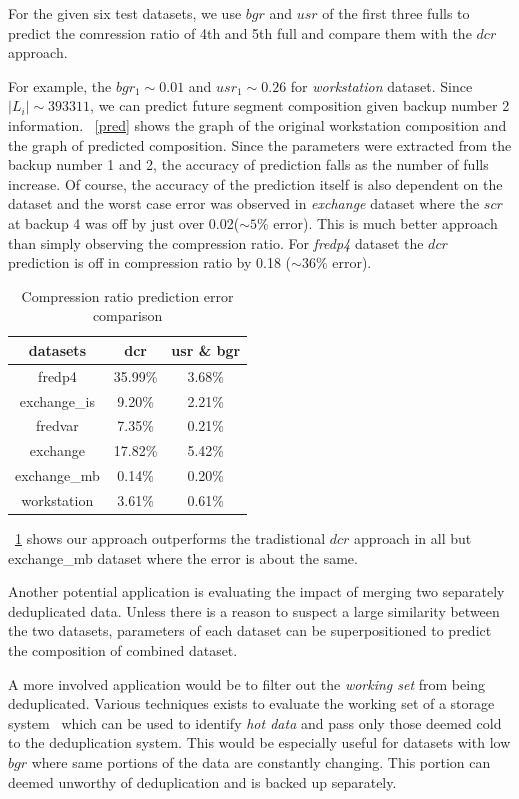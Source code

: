 For the given six test datasets, we use $bgr$ and $usr$ of the first three fulls to predict the comression ratio of 4th and 5th full and compare them with the $dcr$ approach.

For example, the $bgr_1\sim 0.01$ and $usr_1\sim 0.26$ for \emph{workstation} dataset. Since $|L_i|\sim393311$,  we can predict future segment composition given backup number 2 information. \figurename~\ref{pred} shows the graph of the original workstation composition and the graph of predicted composition. Since the parameters were extracted from the backup number 1 and 2, the accuracy of prediction falls as the number of fulls increase. Of course, the accuracy of the prediction itself is also dependent on the dataset and the worst case error was observed in \emph{exchange} dataset where the $\mathit{scr}$ at backup 4 was off by just over 0.02($\sim5\%$ error). This is much better approach than simply observing the compression ratio. For \emph{fredp4} dataset the $dcr$  prediction is off in compression ratio by 0.18 ($\sim36\%$ error).

\begin{table}[!t]
\renewcommand{\arraystretch}{1.3}
\caption{Compression ratio prediction error comparison}
\label{err}
\centering
\begin{tabular}{c||c c}
\hline
\bfseries datasets &\bfseries dcr	 	&\bfseries usr \& bgr	\\
\hline\hline
fredp4		&35.99\%			&3.68\%					\\
exchange\_is	&9.20\%			&2.21\%				\\
fredvar		&7.35\%			&0.21\%						\\
exchange 		&17.82\%			&5.42\%					\\
exchange\_mb 	&0.14\%			&0.20\%				\\
workstation		&3.61\%			&0.61\%				\\			
\hline
\end{tabular}
\end{table}

\tablename~\ref{err} shows our approach outperforms the tradistional $dcr$ approach in all but exchange\_mb dataset where the error is about the same.

Another potential application is evaluating the impact of merging two separately deduplicated data. Unless there is a reason to suspect a large similarity between the two datasets, parameters of each dataset can be superpositioned to predict the composition of combined dataset. 

A more involved application would be to filter out the \emph{working set} from being deduplicated. Various techniques exists to evaluate the working set of a storage system~\cite{lee:2009, wang:2004} which can be used to identify \emph{hot data} and pass only those deemed cold to the deduplication system. This would be especially useful for datasets with low $bgr$ where same portions of the data are constantly changing. This portion can deemed unworthy of deduplication and is backed up separately. 

